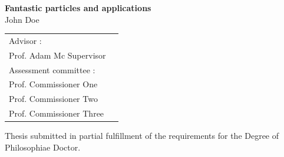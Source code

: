 \documentclass[../main]{subfiles}
\begin{document}
\begin{titlingpage}
\vspace*{-1.5cm}
\begin{center}
  \vspace*{6cm}
  \LARGE 
  \textbf{Fantastic particles and applications}\\
   \vspace*{0.5cm}
   John Doe \\
\end{center}
%
\vspace*{4cm}
\large
\begin{flushleft}
\begin{tabular}{ll}
 \hspace*{1pt}Advisor : & \\[3pt]
 Prof. Adam Mc Supervisor& \\[10pt]
 Assessment committee : & \\[3pt]
 Prof. Commissioner One  & \\[3pt]
 Prof. Commissioner Two & \\[3pt]
 Prof. Commissioner Three & 
\end{tabular}
\end{flushleft}
\vfill
\begin{center}
\scriptsize{Thesis submitted in partial fulfillment of the requirements for the Degree of Philosophiae Doctor}.
\end{center} 

\clearpage
\thispagestyle{empty}


\end{titlingpage}
\end{document}
